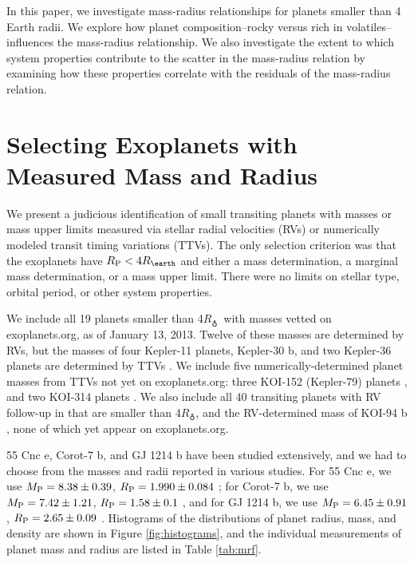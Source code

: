 \documentclass[iop]{emulateapj}
\newcommand{\rpl}{\ensuremath{R_{\rm P}}}
\newcommand{\mpl}{\ensuremath{M_{\rm P}}}
\newcommand{\rearth}{\ensuremath{R_\earth}}
\begin{document}
In this paper, we investigate mass-radius relationships for planets smaller than 4 Earth radii.  We explore how planet composition--rocky versus rich in volatiles-- influences the mass-radius relationship.  We also investigate the extent to which system properties contribute to the scatter in the mass-radius relation by examining how these properties correlate with the residuals of the mass-radius relation.


\section{Selecting Exoplanets with Measured Mass and Radius}
We present a judicious identification of small transiting planets with masses or mass upper limits measured via stellar radial velocities (RVs) or numerically modeled transit timing variations (TTVs).  The only selection criterion was that the exoplanets have $\rpl < 4 \rearth$ and either a mass determination, a marginal mass determination, or a mass upper limit.  There were no limits on stellar type, orbital period, or other system properties.

We include all 19 planets smaller than 4\rearth\ with masses vetted on exoplanets.org, as of January 13, 2013.  Twelve of these masses are determined by RVs, but the masses of four Kepler-11 planets, Kepler-30 b, and two Kepler-36 planets are determined by TTVs \citep{Lissauer2013, Sanchis-Ojeda2012, Carter2012}.  We include five numerically-determined planet masses from TTVs not yet on exoplanets.org: three KOI-152 (Kepler-79) planets \citep{Jontof-Hutter2013}, and two KOI-314 planets \citep{Kipping2014}.  We also include all 40 transiting planets with RV follow-up in \citet{Marcy2014} that are smaller than 4\rearth, and the RV-determined mass of KOI-94 b \citep{Weiss2013}, none of which yet appear on exoplanets.org.  

55 Cnc e, Corot-7 b, and GJ 1214 b have been studied extensively, and we had to choose from the masses and radii reported in various studies.  For 55 Cnc e, we use $\mpl = 8.38\pm0.39$, $\rpl = 1.990\pm0.084$ \citep{Endl2012,Dragomir2013a}; for Corot-7 b, we use $\mpl =7.42\pm1.21$, $\rpl= 1.58\pm 0.1$ \citep{Hatzes2011}, and for GJ 1214 b, we use $\mpl =6.45\pm0.91 $, $\rpl= 2.65\pm0.09$ \citep{Carter2011}.  Histograms of the distributions of planet radius, mass, and density are shown in Figure \ref{fig:histograms}, and the individual measurements of planet mass and radius are listed in Table \ref{tab:mrf}.
\end{document}
